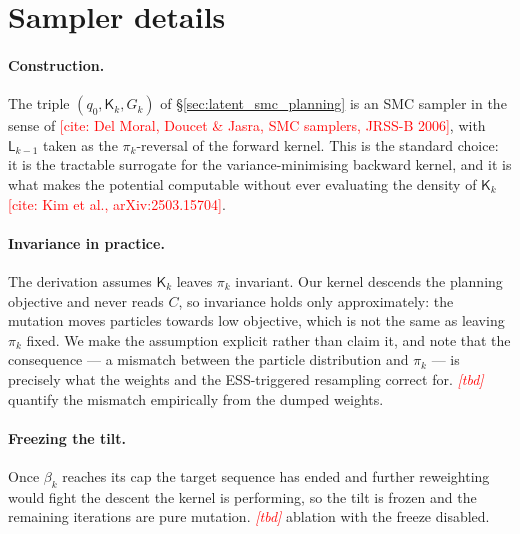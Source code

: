 %
\providecommand{\tbd}{\textcolor{red}{\textit{[tbd]}}}
\providecommand{\needcite}[1]{\textcolor{red}{[cite: #1]}}

\section{Sampler details}
\label{app:smc}

\paragraph{Construction.} The triple $(q_0,\mathsf{K}_k,G_k)$ of
\S\ref{sec:latent_smc_planning} is an SMC sampler in the sense of
\needcite{Del Moral, Doucet \& Jasra, SMC samplers, JRSS-B 2006}, with $\mathsf{L}_{k-1}$ taken as the $\pi_k$-reversal of
the forward kernel. This is the standard choice: it is the tractable surrogate
for the variance-minimising backward kernel, and it is what makes the potential
computable without ever evaluating the density of $\mathsf{K}_k$
\needcite{Kim et al., arXiv:2503.15704}.

\paragraph{Invariance in practice.} The derivation assumes $\mathsf{K}_k$ leaves
$\pi_k$ invariant. Our kernel descends the planning objective and never reads
$C$, so invariance holds only approximately: the mutation moves particles
towards low objective, which is not the same as leaving $\pi_k$ fixed. We make
the assumption explicit rather than claim it, and note that the consequence ---
a mismatch between the particle distribution and $\pi_k$ --- is precisely what
the weights and the ESS-triggered resampling correct for. \tbd{} quantify the
mismatch empirically from the dumped weights.

\paragraph{Freezing the tilt.} Once $\beta_k$ reaches its cap the target sequence
has ended and further reweighting would fight the descent the kernel is
performing, so the tilt is frozen and the remaining iterations are pure
mutation. \tbd{} ablation with the freeze disabled.

